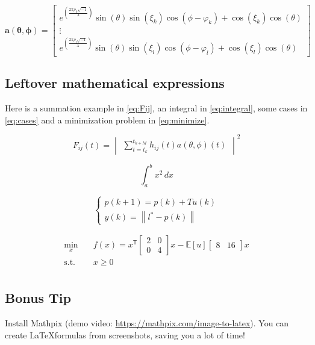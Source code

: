 \begin{equation}
    \mathbf{a(\theta, \phi)} =
    \begin{bmatrix}
        e^{( \frac{2 \pi \rho_k \sqrt{-1}}{\lambda} )} \sin(\theta) \sin(\xi_k) \cos(\phi - \varphi_k) + \cos(\xi_k) \cos(\theta) \\
        \vdots \\
        e^{( \frac{2 \pi \rho_{l} \sqrt{-1}}{\lambda} )} \sin(\theta) \sin(\xi_{l}) \cos(\phi - \varphi_{l}) + \cos(\xi_{l}) \cos(\theta)
    \end{bmatrix}
    \label{eq:matrix}
\end{equation}

\subsection{Leftover mathematical expressions}
Here is a summation example in \autoref{eq:Fij}, an integral in \autoref{eq:integral}, some cases in \autoref{eq:cases} and a minimization problem in \autoref{eq:minimize}.

\begin{equation}
    F_{ij}(t) = \begin{vmatrix} \sum\limits_{t=t_k}^{t_{k+M}} h_{ij}(t) a(\theta,\phi)(t) \end{vmatrix} ^2
    \label{eq:Fij}
\end{equation}

\begin{equation}
    \int_{a}^{b} x^2 \,dx
    \label{eq:integral}
\end{equation}

\begin{equation}
    \begin{cases}
        p(k+1) = p(k) + T u(k) \\
        y(k) = \left\|l^* - p(k) \right\|
    \end{cases}
    \label{eq:cases}
\end{equation}

\begin{equation}
\begin{aligned}
    \min_{x} \quad & f(x) = x^\mathsf{T} 
    \begin{bmatrix} 
     2 & 0 \\ 0 & 4
    \end{bmatrix}
    x - \mathbb{E}[u]
    \begin{bmatrix} 
     8 & 16
    \end{bmatrix}
    x\\
    \textrm{s.t.} \quad & x \geq 0\\
\end{aligned}
\label{eq:minimize}
\end{equation}

\subsection{Bonus Tip}
Install Mathpix (demo video: \url{https://mathpix.com/image-to-latex}). You can create \LaTeX formulas from screenshots, saving you a lot of time!